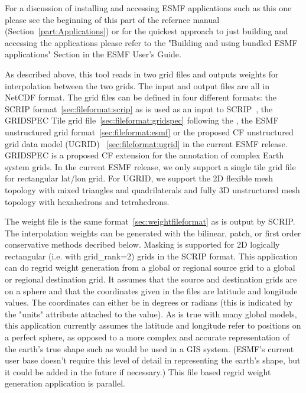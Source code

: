 For a discussion of installing and accessing ESMF applications such as this one please see the beginning of this part of the refernce manual (Section~\ref{part:Applications}) or for the quickest approach to just building and accessing the applications please refer to the "Building and using bundled ESMF applications" Section in the ESMF User's Guide.

As described above, this tool reads in
two grid files and outputs weights for interpolation
between the two grids. The input and output files are all in NetCDF format. The grid files can be defined in four
different formats:  the SCRIP format~\ref{sec:fileformat:scrip} as is used as an input to SCRIP~\cite{ref:SCRIP}, the GRIDSPEC Tile grid file~\ref{sec:fileformat:gridspec} following the
,
the ESMF unstructured grid format~\ref{sec:fileformat:esmf} or the proposed CF unstructured grid data model (UGRID) ~\ref{sec:fileformat:ugrid}
in the current ESMF release.  GRIDSPEC is a proposed CF extension for the annotation of complex Earth system grids.  In the current ESMF release, we only support a single tile grid file for rectangular lat/lon grid.  For UGRID, we support the 2D flexible mesh topology with mixed triangles and quadrilaterals and fully 3D unstructured mesh topology with hexahedrons and tetrahedrons.

The weight file is the same format~\ref{sec:weightfileformat} as is
output by SCRIP. The interpolation weights can be generated with
the bilinear, patch, or first order conservative methods decribed below. Masking is supported for 2D logically rectangular (i.e. with grid\_rank=2) grids in the SCRIP format. This application
can do regrid weight generation from a global or regional source grid to a global or regional destination grid.
It assumes that the source and destination grids are on a sphere and that the coordinates given in
the files are latitude and longitude values. The coordinates can either be in degrees or radians (this is indicated by the "units" attribute attached to the value).
As is true with many global models, this application currently assumes the latitude and longitude refer to positions on a perfect sphere, as opposed to a more complex
and accurate representation of the earth's true shape such as would be used in a GIS system. (ESMF's current user base doesn't require this level of detail in representing the earth's shape, but it could be added in the future if necessary.)  This file based regrid weight generation application
is parallel.


